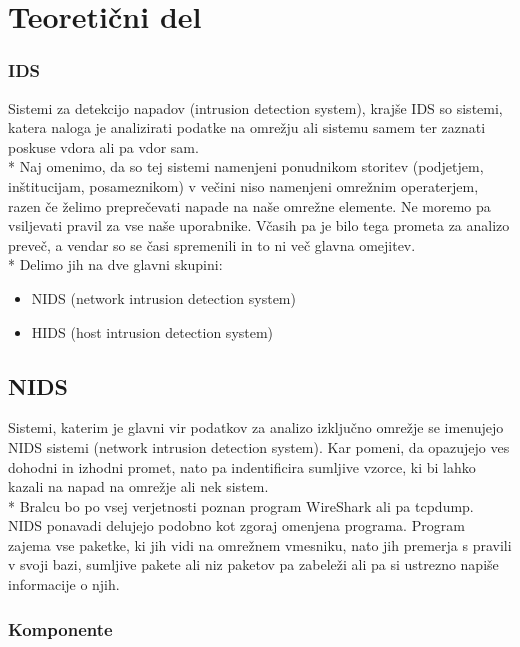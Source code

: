 \documentclass[12pt]{article}
\let\stdsection\section
\renewcommand\section{\newpage\stdsection}
\begin{document}
\section{Teoretični del}



\subsubsection{IDS} %
\label{ssub:IDS}


Sistemi za detekcijo napadov (intrusion detection system), krajše IDS
so sistemi, katera naloga je analizirati podatke na omrežju ali sistemu samem
ter zaznati poskuse vdora ali pa vdor sam.
\\*
Naj omenimo, da so tej sistemi namenjeni ponudnikom storitev (podjetjem, inštitucijam, posameznikom)
v večini niso namenjeni omrežnim operaterjem, razen če želimo preprečevati napade na naše omrežne elemente. 
Ne moremo pa vsiljevati pravil za vse naše uporabnike. Včasih pa je bilo tega prometa za analizo preveč, a vendar
so se časi spremenili in to ni več glavna omejitev.
\\*
Delimo jih na dve glavni skupini:

\begin{itemize}
    \item NIDS (network intrusion detection system)
    \item HIDS (host intrusion detection system)
\end{itemize}


\subsection{NIDS}

Sistemi, katerim je glavni vir podatkov za analizo izključno omrežje se imenujejo NIDS sistemi (network intrusion detection system).
Kar pomeni, da opazujejo ves dohodni in izhodni promet, nato pa indentificira sumljive vzorce, ki bi lahko kazali na napad na omrežje ali nek sistem.
\\*
Bralcu bo po vsej verjetnosti poznan program WireShark ali pa tcpdump.
NIDS ponavadi delujejo podobno kot zgoraj omenjena programa. Program zajema vse paketke, ki jih vidi na omrežnem vmesniku,
nato jih premerja s pravili v svoji bazi, sumljive pakete ali niz paketov pa zabeleži ali pa si ustrezno napiše informacije o njih.

\subsubsection{Komponente} %
\end{document}
